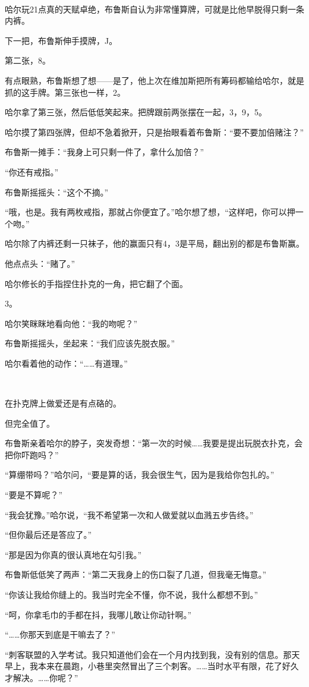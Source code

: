 \documentclass[../main]{subfiles}
\begin{document}
~\

哈尔玩21点真的天赋卓绝，布鲁斯自认为非常懂算牌，可就是比他早脱得只剩一条内裤。

下一把，布鲁斯伸手摸牌，J。

第二张，8。

有点眼熟，布鲁斯想了想——是了，他上次在维加斯把所有筹码都输给哈尔，就是抓的这手牌。第三张也一样，2。

哈尔拿了第三张，然后低低笑起来。把牌跟前两张摆在一起，3，9，5。

哈尔摸了第四张牌，但却不急着掀开，只是抬眼看着布鲁斯：“要不要加倍赌注？”

布鲁斯一摊手：“我身上可只剩一件了，拿什么加倍？”

“你还有戒指。”

布鲁斯摇摇头：“这个不摘。”

“哦，也是。我有两枚戒指，那就占你便宜了。”哈尔想了想，“这样吧，你可以押一个吻。”

哈尔除了内裤还剩一只袜子，他的赢面只有4，3是平局，翻出别的都是布鲁斯赢。

他点点头：“赌了。”

哈尔修长的手指捏住扑克的一角，把它翻了个面。

3。

哈尔笑眯眯地看向他：“我的吻呢？”

布鲁斯摇摇头，坐起来：“我们应该先脱衣服。”

哈尔看着他的动作：“……有道理。”

~\

在扑克牌上做爱还是有点硌的。

但完全值了。

布鲁斯亲着哈尔的脖子，突发奇想：“第一次的时候……我要是提出玩脱衣扑克，会把你吓跑吗？”

“算绷带吗？”哈尔问，“要是算的话，我会很生气，因为是我给你包扎的。”

“要是不算呢？”

“我会犹豫。”哈尔说，“我不希望第一次和人做爱就以血溅五步告终。”

“但你最后还是答应了。”

“那是因为你真的很认真地在勾引我。”

布鲁斯低低笑了两声：“第二天我身上的伤口裂了几道，但我毫无悔意。”

“你该让我给你缝上的。我当时完全不懂，你不说，我什么都想不到。”

“呵，你拿毛巾的手都在抖，我哪儿敢让你动针啊。”

“……你那天到底是干嘛去了？”

“刺客联盟的入学考试。我只知道他们会在一个月内找到我，没有别的信息。那天早上，我本来在晨跑，小巷里突然冒出了三个刺客。……当时水平有限，花了好久才解决。……你呢？”
\end{document}
